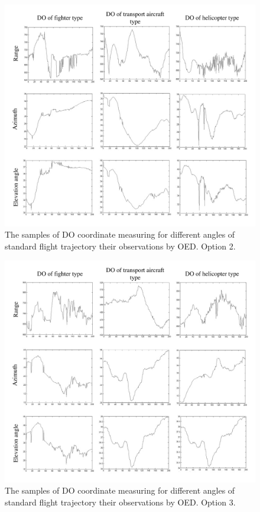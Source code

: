 \begin{figure}[h]
\setcaptionmargin{5mm}
\onelinecaptionstrue
\includegraphics[width=1.0\textwidth]{pics/fig_1_option_2.pdf}
\caption{The samples of DO coordinate measuring for different angles of standard flight trajectory their observations by OED. Option 2.}\label{fig:fig_1_option_2}
\end{figure}

\begin{figure}[h]
\setcaptionmargin{5mm}
\onelinecaptionstrue
\includegraphics[width=1.0\textwidth]{pics/fig_1_option_3.pdf}
\caption{The samples of DO coordinate measuring for different angles of standard flight trajectory their observations by OED. Option 3.}\label{fig:fig_1_option_3}
\end{figure}
